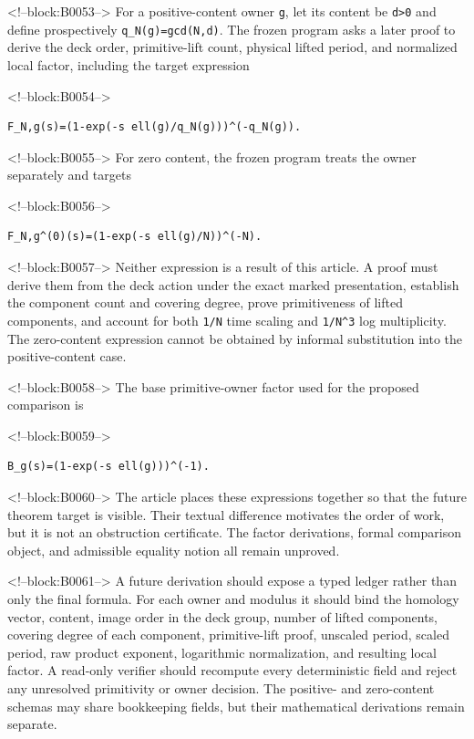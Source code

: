 \documentclass[11pt]{article}
\begin{document}
<!--block:B0053-->
For a positive-content owner \texttt{g}, let its content be
\texttt{d\textgreater{}0} and define prospectively
\texttt{q\_N(g)=gcd(N,d)}. The frozen program asks a later proof to
derive the deck order, primitive-lift count, physical lifted period, and
normalized local factor, including the target expression

<!--block:B0054-->
\begin{verbatim}
F_N,g(s)=(1-exp(-s ell(g)/q_N(g)))^(-q_N(g)).
\end{verbatim}

<!--block:B0055-->
For zero content, the frozen program treats the owner separately and
targets

<!--block:B0056-->
\begin{verbatim}
F_N,g^(0)(s)=(1-exp(-s ell(g)/N))^(-N).
\end{verbatim}

<!--block:B0057-->
Neither expression is a result of this article. A proof must derive them from
the deck action under the exact marked presentation, establish the
component count and covering degree, prove primitiveness of lifted
components, and account for both \texttt{1/N} time scaling and
\texttt{1/N\^{}3} log multiplicity. The zero-content expression cannot
be obtained by informal substitution into the positive-content case.

<!--block:B0058-->
The base primitive-owner factor used for the proposed comparison is

<!--block:B0059-->
\begin{verbatim}
B_g(s)=(1-exp(-s ell(g)))^(-1).
\end{verbatim}

<!--block:B0060-->
The article places these expressions together so that the future theorem
target is visible. Their textual difference motivates the order of work,
but it is not an obstruction certificate. The factor derivations, formal
comparison object, and admissible equality notion all remain unproved.

<!--block:B0061-->
A future derivation should expose a typed ledger rather than only the
final formula. For each owner and modulus it should bind the homology
vector, content, image order in the deck group, number of lifted
components, covering degree of each component, primitive-lift proof,
unscaled period, scaled period, raw product exponent, logarithmic
normalization, and resulting local factor. A read-only verifier should
recompute every deterministic field and reject any unresolved
primitivity or owner decision. The positive- and zero-content schemas
may share bookkeeping fields, but their mathematical derivations remain
separate.
\end{document}
